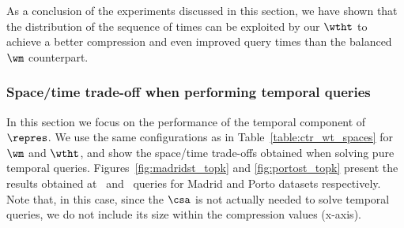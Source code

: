 %


As a conclusion of the experiments discussed in this section, we have shown that
the distribution of the sequence of times can be
exploited by our $\wtht$ to achieve a better compression and even improved
query times than the balanced $\wm$ counterpart.


\subsubsection{Space/time trade-off when performing temporal  queries}

In this section we focus on the performance of the temporal component of $\repres$. We use the same 
configurations as in Table~\ref{table:ctr_wt_spaces} for $\wm$ and $\wtht$, and 
show the space/time trade-offs obtained when solving pure temporal queries. Figures~\ref{fig:madridst_topk}
and \ref{fig:portost_topk} present the results obtained at  \Tut\ and \Tst\ queries for Madrid and Porto datasets respectively. 
Note that, in this case, since the $\csa$ is not actually needed to solve temporal queries, we do not include its size
within the compression values (x-axis). 




